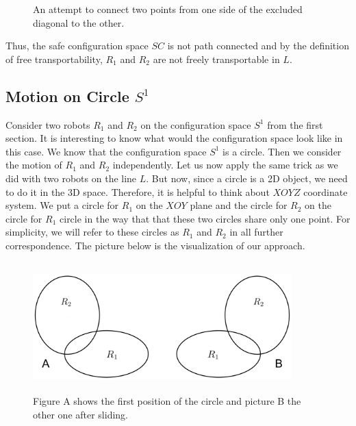 \documentclass[12pt]{article}
\theoremstyle{definition}
\begin{document}
\begin{figure}[H]
    \centering
    \caption*{An attempt to connect two points from one side of the excluded diagonal to the other.}
\end{figure}

Thus, the safe configuration space $SC$ is not path connected and by the definition of
free transportability, $R_1$ and $R_2$ are not freely transportable in $L$.

\subsection*{\centering Motion on Circle $S^1$}

Consider two robots $R_1$ and $R_2$ on the configuration space $S^1$ from the first section.
It is interesting to know what would the configuration space look like in this case.
We know that the configuration space $S^1$ is a circle. Then we consider the motion of $R_1$ and $R_2$ independently.
Let us now apply the same trick as we did with two robots on the line $L$. But now, since a circle is a 2D object,
we need to do it in the 3D space. Therefore, it is helpful to think about $XOYZ$ coordinate system.
We put a circle for $R_1$ on the $XOY$ plane and the circle for $R_2$ on the circle for $R_1$ circle in the way that
that these two circles share only one point. For simplicity, we will refer to these circles as $R_1$ and $R_2$
in all further correspondence. The picture below is the visualization of our approach.

\begin{figure}[H]
    \centering
    \includegraphics[width=10cm, height=5cm]{two-circles}
    \caption*{Figure A shows the first position of the circle and picture B the other one after sliding.}
\end{figure}
\end{document}
